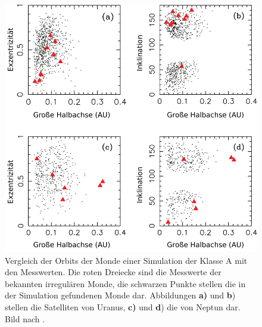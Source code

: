 \documentclass[12pt,a4paper,twoside]{article}
\renewcommand{\cite}{\citep}
\begin{document}
\begin{figure}[tbn]
\centering
\includegraphics[scale=0.7]{img/Nesvorny2007-4}
\caption{Vergleich der Orbits der Monde einer Simulation der Klasse A mit den Messwerten. Die roten Dreiecke sind die Messwerte der bekannten irregulären Monde, die schwarzen Punkte stellen die in der Simulation gefundenen Monde dar. Abbildungen \textbf{a)} und \textbf{b}) stellen die Satelliten von Uranus, \textbf{c)} und \textbf{d}) die von Neptun dar. Bild nach \cite{Nesvorny2007}.}
\label{fig:KlasseA_Mondorbitale}
\end{figure}
\end{document}
